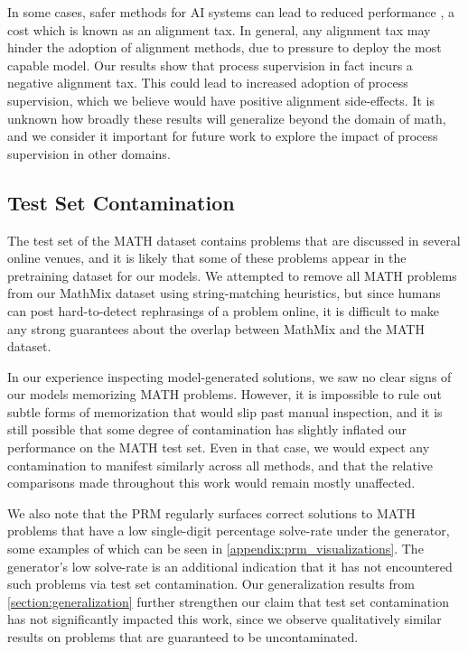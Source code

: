 In some cases, safer methods for AI systems can lead to reduced performance \citep{ouyang2022training, askell2021general}, a cost which is known as an alignment tax. In general, any alignment tax may hinder the adoption of alignment methods, due to pressure to deploy the most capable model. Our results show that process supervision in fact incurs a negative alignment tax. This could lead to increased adoption of process supervision, which we believe would have positive alignment side-effects. It is unknown how broadly these results will generalize beyond the domain of math, and we consider it important for future work to explore the impact of process supervision in other domains.

\subsection{Test Set Contamination} \label{section:contamination}

The test set of the MATH dataset contains problems that are discussed in several online venues, and it is likely that some of these problems appear in the pretraining dataset for our models. We attempted to remove all MATH problems from our MathMix dataset using string-matching heuristics, but since humans can post hard-to-detect rephrasings of a problem online, it is difficult to make any strong guarantees about the overlap between MathMix and the MATH dataset.

In our experience inspecting model-generated solutions, we saw no clear signs of our models memorizing MATH problems. However, it is impossible to rule out subtle forms of memorization that would slip past manual inspection, and it is still possible that some degree of contamination has slightly inflated our performance on the MATH test set. Even in that case, we would expect any contamination to manifest similarly across all methods, and that the relative comparisons made throughout this work would remain mostly unaffected.

We also note that the PRM regularly surfaces correct solutions to MATH problems that have a low single-digit percentage solve-rate under the generator, some examples of which can be seen in \ref{appendix:prm_visualizations}. The generator's low solve-rate is an additional indication that it has not encountered such problems via test set contamination. Our generalization results from \ref{section:generalization} further strengthen our claim that test set contamination has not significantly impacted this work, since we observe qualitatively similar results on problems that are guaranteed to be uncontaminated.

